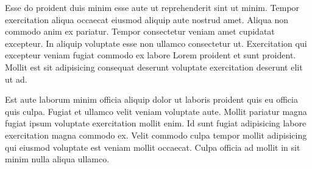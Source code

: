 Esse do proident duis minim esse aute ut reprehenderit sint ut minim. Tempor exercitation aliqua occaecat eiusmod aliquip aute nostrud amet. Aliqua non commodo anim ex pariatur. Tempor consectetur veniam amet cupidatat excepteur. In aliquip voluptate esse non ullamco consectetur ut. Exercitation qui excepteur veniam fugiat commodo ex labore Lorem proident et sunt proident. Mollit est sit adipisicing consequat deserunt voluptate exercitation deserunt elit ut ad.

Est aute laborum minim officia aliquip dolor ut laboris proident quis eu officia quis culpa. Fugiat et ullamco velit veniam voluptate aute. Mollit pariatur magna fugiat ipsum voluptate exercitation mollit enim. Id sunt fugiat adipisicing labore exercitation magna commodo ex. Velit commodo culpa tempor mollit adipisicing qui eiusmod voluptate est veniam mollit occaecat. Culpa officia ad mollit in sit minim nulla aliqua ullamco.